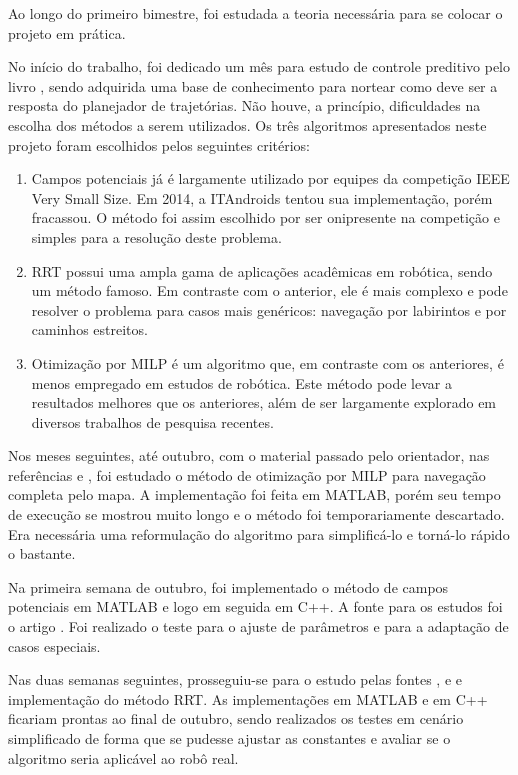 \documentclass[a4paper,12pt]{article}
\begin{document}
Ao longo do primeiro bimestre, foi estudada a teoria necessária para se colocar o projeto em prática.
    
No início do trabalho, foi dedicado um mês para estudo de controle preditivo pelo livro \cite{maciejowski2002}, sendo adquirida uma base de conhecimento para nortear como deve ser a resposta do planejador de trajetórias. Não houve, a princípio, dificuldades na escolha dos métodos a serem utilizados. Os três algoritmos apresentados neste projeto foram escolhidos pelos seguintes critérios:

\begin{enumerate}
\item Campos potenciais já é largamente utilizado por equipes da competição IEEE Very Small Size. Em 2014, a ITAndroids tentou sua implementação, porém fracassou. O método foi assim escolhido por ser onipresente na competição e simples para a resolução deste problema.
\item RRT possui uma ampla gama de aplicações acadêmicas em robótica, sendo um método famoso. Em contraste com o anterior, ele é mais complexo e pode resolver o problema para casos mais genéricos: navegação por labirintos e por caminhos estreitos.
\item Otimização por MILP é um algoritmo que, em contraste com os anteriores, é menos empregado em estudos de robótica. Este método pode levar a resultados melhores que os anteriores, além de ser largamente explorado em diversos trabalhos de pesquisa recentes.
\end{enumerate}

Nos meses seguintes, até outubro, com o material passado pelo orientador, nas referências \cite{bellingham2002} e \cite{rubens2015}, foi estudado o método de otimização por MILP para navegação completa pelo mapa. A implementação foi feita em MATLAB, porém seu tempo de execução se mostrou muito longo e o método foi temporariamente descartado. Era necessária uma reformulação do algoritmo para simplificá-lo e torná-lo rápido o bastante.

Na primeira semana de outubro, foi implementado o método de campos potenciais em MATLAB e logo em seguida em C++. A fonte para os estudos foi o artigo \cite{khatib1986}. Foi realizado o teste para o ajuste de parâmetros e para a adaptação de casos especiais.

Nas duas semanas seguintes, prosseguiu-se para o estudo pelas fontes \cite{lavalle2011}, \cite{rubens2009} e \cite{howiechoset} e implementação do método RRT. As implementações em MATLAB e em C++ ficariam prontas ao final de outubro, sendo realizados os testes em cenário simplificado de forma que se pudesse ajustar as constantes e avaliar se o algoritmo seria aplicável ao robô real.
\end{document}
